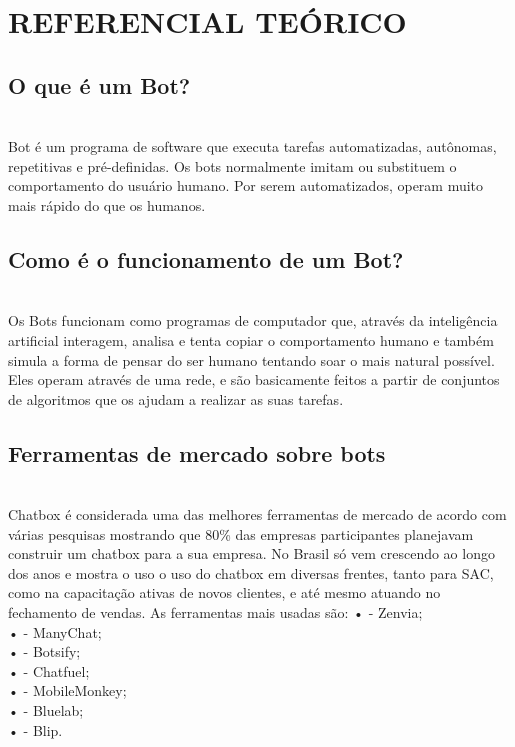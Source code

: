\chapter{\uppercase{Referencial Teórico}}
\label{referencial}

\section{O que é um Bot?}\\
Bot é um programa de software que executa tarefas automatizadas, autônomas, repetitivas e pré-definidas. Os bots normalmente imitam ou substituem o comportamento do usuário humano. Por serem automatizados, operam muito mais rápido do que os humanos.
 
\section{Como é o funcionamento de um Bot?}\\
Os Bots funcionam como programas de computador que, através da inteligência artificial interagem, analisa e tenta copiar o comportamento humano e também simula a forma de pensar do ser humano tentando soar o mais natural possível.
Eles operam através de uma rede, e são basicamente feitos a partir de conjuntos de algoritmos que os ajudam a realizar as suas tarefas.

\section{Ferramentas de mercado sobre bots}\\
Chatbox é considerada uma das melhores ferramentas de mercado de acordo com várias pesquisas mostrando que 80\% das empresas participantes planejavam construir um chatbox para a sua empresa. No Brasil só vem crescendo ao longo dos anos e mostra o uso o uso do chatbox em diversas frentes, tanto para SAC, como na capacitação ativas de novos clientes, e até mesmo atuando no fechamento de vendas. 
As ferramentas mais usadas são: 
•	- Zenvia;\\
•	- ManyChat;\\
•	- Botsify;\\
•	- Chatfuel;\\
•	- MobileMonkey;\\
•	- Bluelab;\\
•	- Blip.